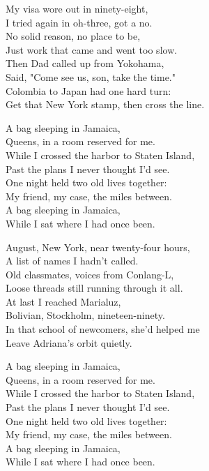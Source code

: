 \begin{lyrics}
My visa wore out in ninety-eight,\\
I tried again in oh-three, got a no.\\
No solid reason, no place to be,\\
Just work that came and went too slow.\\
Then Dad called up from Yokohama,\\
Said, "Come see us, son, take the time."\\
Colombia to Japan had one hard turn:\\
Get that New York stamp, then cross the line.

A bag sleeping in Jamaica,\\
Queens, in a room reserved for me.\\
While I crossed the harbor to Staten Island,\\
Past the plans I never thought I'd see.\\
One night held two old lives together:\\
My friend, my case, the miles between.\\
A bag sleeping in Jamaica,\\
While I sat where I had once been.

August, New York, near twenty-four hours,\\
A list of names I hadn't called.\\
Old classmates, voices from Conlang-L,\\
Loose threads still running through it all.\\
At last I reached Marialuz,\\
Bolivian, Stockholm, nineteen-ninety.\\
In that school of newcomers, she'd helped me\\
Leave Adriana's orbit quietly.

A bag sleeping in Jamaica,\\
Queens, in a room reserved for me.\\
While I crossed the harbor to Staten Island,\\
Past the plans I never thought I'd see.\\
One night held two old lives together:\\
My friend, my case, the miles between.\\
A bag sleeping in Jamaica,\\
While I sat where I had once been.


\end{lyrics}
